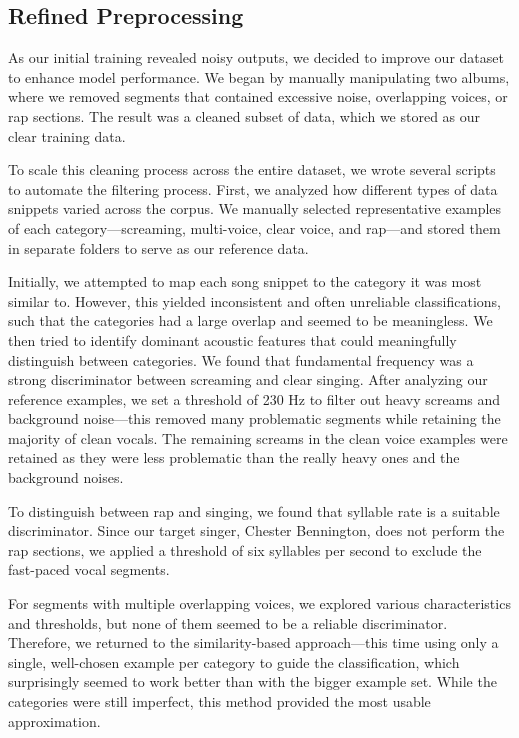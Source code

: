 \documentclass[a4paper]{article}
\begin{document}
\subsection{Refined Preprocessing}
As our initial training revealed noisy outputs, we decided to improve our dataset to enhance model performance. We began by manually manipulating two albums, where we removed segments that contained excessive noise, overlapping voices, or rap sections. The result was a cleaned subset of data, which we stored as our clear training data.

To scale this cleaning process across the entire dataset, we wrote several scripts to automate the filtering process. First, we analyzed how different types of data snippets varied across the corpus. We manually selected representative examples of each category—screaming, multi-voice, clear voice, and rap—and stored them in separate folders to serve as our reference data.

Initially, we attempted to map each song snippet to the category it was most similar to. However, this yielded inconsistent and often unreliable classifications, such that the categories had a large overlap and seemed to be meaningless. We then tried to identify dominant acoustic features that could meaningfully distinguish between categories. We found that fundamental frequency was a strong discriminator between screaming and clear singing. After analyzing our reference examples, we set a threshold of 230 Hz to filter out heavy screams and background noise—this removed many problematic segments while retaining the majority of clean vocals. The remaining screams in the clean voice examples were retained as they were less problematic than the really heavy ones and the background noises.

To distinguish between rap and singing, we found that syllable rate is a suitable discriminator. Since our target singer, Chester Bennington, does not perform the rap sections, we applied a threshold of six syllables per second to exclude the fast-paced vocal segments.

For segments with multiple overlapping voices, we explored various characteristics and thresholds, but none of them seemed to be a reliable discriminator. Therefore, we returned to the similarity-based approach—this time using only a single, well-chosen example per category to guide the classification, which surprisingly seemed to work better than with the bigger example set. While the categories were still imperfect, this method provided the most usable approximation.
\end{document}
